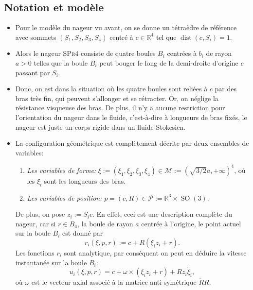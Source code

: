 \documentclass[10pt,a4paper]{article}
\theoremstyle{plain}
\theoremstyle{plain}
\theoremstyle{plain}
\theoremstyle{definition}
\theoremstyle{definition}
\theoremstyle{definition}
\theoremstyle{plain}
\newcommand{\M}{\mathcal{M}}
\newcommand{\R}{\mathbb{R}}
\DeclareMathOperator{\dist}{dist}
\DeclareMathOperator{\SO}{SO}
\begin{document}
\subsection{Notation et modèle}
\begin{itemize}

\item Pour le modèle du nageur vu avant, on se donne un tétraèdre de référence avec sommets $(S_1, S_2, S_3, S_4)$ centré à $c \in \R^4$ tel que $\dist(c, S_i) = 1$.

\item Alors le nageur \textsc{SPr4} consiste de quatre boules $B_i$ centrées à $b_i$ de rayon $a > 0$ telles que la boule $B_i$ peut bouger le long de la demi-droite d'origine $c$ passant par $S_i$.

\item Donc, on est dans la situation où les quatre boules sont reliées à $c$ par des bras très fin, qui peuvent s'allonger et se rétracter. Or, on néglige la résistance visqueuse des bras. De plus, il n'y a aucune restriction pour l'orientation du nageur dans le fluide, c'est-à-dire à longueurs de bras fixés, le nageur est juste un corps rigide dans un fluide Stokesien.

\item La configuration géométrique est complètement décrite par deux ensembles de variables:
\begin{enumerate}
\item \emph{Les variables de forme:} $\xi := (\xi_1, \xi_2, \xi_3, \xi_4) \in \M := (\sqrt{3/2}a, + \infty)^4$, où les $\xi_i$ sont les longueurs des bras.

\item \emph{Les variables de position:} $p = (c, R) \in \mathcal{P} := \R^3 \times \SO(3)$.
\end{enumerate}
De plus, on pose $z_i := \overline{S_i c}$. En effet, ceci est une description complète du nageur, car si $r \in B_a$, la boule de rayon $a$ centrée à l'origine, le point actuel sur la boule $B_i$ est donné par
\begin{equation}
	r_i(\xi, p, r) :=  c + R(\xi_i z_i + r).
\end{equation}
Les fonctions $r_i$ sont analytique, par conséquent on peut en déduire la vitesse instantanée sur la boule $B_i$:
\begin{equation}
	u_i(\xi, p, r) = \dot{c} + \omega \times (\xi_i z_i + r) + R z_i \dot{\xi}_i,
\end{equation}
où $\omega$ est le vecteur axial associé à la matrice anti-symétrique $\dot{R}R$.


\end{itemize}
\end{document}
